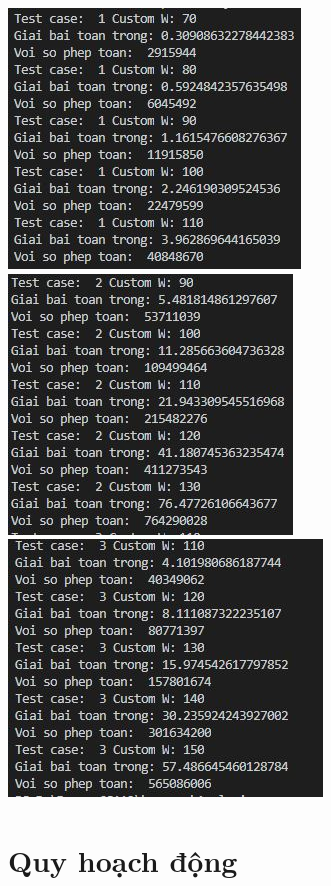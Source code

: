 \documentclass[12pt,a4paper]{report}
\begin{document}
    \begin{center}
        \includegraphics{RT1.JPG}
        \includegraphics{RT2.JPG}
        \includegraphics{RT3.JPG}
    \end{center}

    \section{Quy hoạch động}
\end{document}

